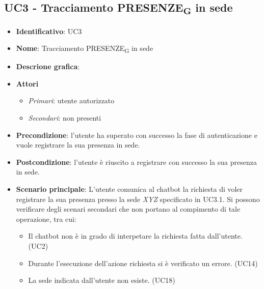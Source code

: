 \subsection{UC3 - Tracciamento PRESENZE\textsubscript{G} in sede}
\begin{itemize}
    \item \textbf{Identificativo}: UC3
    \item \textbf{Nome}: Tracciamento PRESENZE\textsubscript{G} in sede
    \item \textbf{Descrione grafica}:
    \item \textbf{Attori}
 \begin{itemize} 
    \item \textit{Primari}: utente autorizzato
    \item \textit{Secondari}: non presenti
 \end{itemize}
 \item \textbf{Precondizione}: l'utente ha superato con successo la fase di autenticazione e vuole registrare la sua presenza in sede. 
 \item \textbf{Postcondizione}: l'utente è riuscito a registrare con successo la sua presenza in sede. 
 \item \textbf{Scenario principale}: L'utente comunica al chatbot la richiesta di voler registrare la sua presenza presso la sede \textit{XYZ} specificato in UC3.1. Si possono verificare degli scenari secondari che non portano al compimento di tale operazione, tra cui:
    \begin{itemize}
        \item Il chatbot non è in grado di interpetare la richiesta fatta dall'utente. (UC2)
        \item Durante l'esecuzione dell'azione richiesta si è verificato un errore. (UC14)
        \item La sede indicata dall'utente non esiste. (UC18)
    \end{itemize}
\end{itemize}
\newpage

